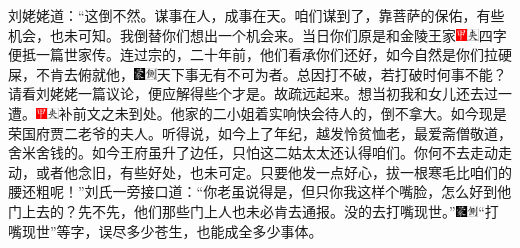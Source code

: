 刘姥姥道：“这倒不然。谋事在人，成事在天。咱们谋到了，靠菩萨的保佑，有些机会，也未可知。我倒替你们想出一个机会来。当日你们原是和金陵王家{\includegraphics[width=3mm]{../Images/00002}\includegraphics[width=3mm]{../Images/00012}\footnotesize \kaishu 四字便抵一篇世家传。}连过宗的，二十年前，他们看承你们还好，如今自然是你们拉硬屎，不肯去俯就他，{\includegraphics[width=3mm]{../Images/00006}\includegraphics[width=3mm]{../Images/00011}\footnotesize \kaishu 天下事无有不可为者。总因打不破，若打破时何事不能？请看刘姥姥一篇议论，便应解得些个才是。}故疏远起来。想当初我和女儿还去过一遭。{\includegraphics[width=3mm]{../Images/00002}\includegraphics[width=3mm]{../Images/00012}\footnotesize \kaishu 补前文之未到处。}他家的二小姐着实响快会待人的，倒不拿大。如今现是荣国府贾二老爷的夫人。听得说，如今上了年纪，越发怜贫恤老，最爱斋僧敬道，舍米舍钱的。如今王府虽升了边任，只怕这二姑太太还认得咱们。你何不去走动走动，或者他念旧，有些好处，也未可定。只要他发一点好心，拔一根寒毛比咱们的腰还粗呢！”刘氏一旁接口道：“你老虽说得是，但只你我这样个嘴脸，怎么好到他门上去的？先不先，他们那些门上人也未必肯去通报。没的去打嘴现世。”{\includegraphics[width=3mm]{../Images/00006}\includegraphics[width=3mm]{../Images/00011}\footnotesize \kaishu “打嘴现世”等字，误尽多少苍生，也能成全多少事体。}

